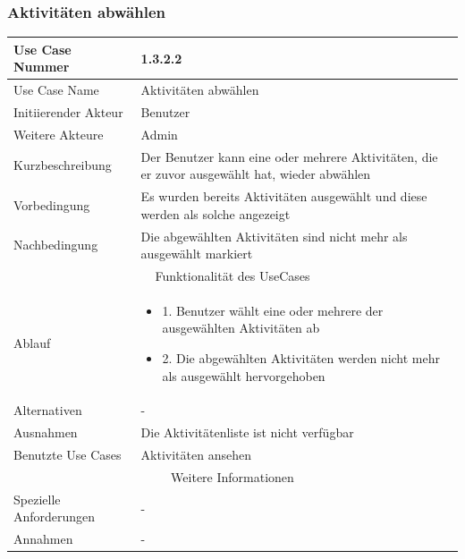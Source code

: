 \documentclass[10pt,a4paper]{article}
\begin{document}
	\subsubsection{Aktivit\"aten abw\"ahlen}
	\begin{tabular}{|l|p{.5\linewidth}|}
	\hline Use Case Nummer & 1.3.2.2 \\ 
	\hline Use Case Name & Aktivit\"aten abw\"ahlen \\ 
	\hline Initiierender Akteur & Benutzer \\
	\hline Weitere Akteure & Admin \\
	\hline Kurzbeschreibung & Der Benutzer kann eine oder mehrere Aktivit\"aten, die er zuvor ausgew\"ahlt hat, wieder abw\"ahlen \\
	\hline Vorbedingung & Es wurden bereits Aktivit\"aten ausgew\"ahlt und diese werden als solche angezeigt \\
	\hline Nachbedingung & Die abgew\"ahlten Aktivit\"aten sind nicht mehr als ausgew\"ahlt markiert \\
	\hline \multicolumn{2}{|c|}{Funktionalität des UseCases}\\
	\hline Ablauf & \begin{itemize}
			\item 1. Benutzer w\"ahlt eine oder mehrere der ausgew\"ahlten Aktivit\"aten ab
			\item 2. Die abgew\"ahlten Aktivit\"aten werden nicht mehr als ausgew\"ahlt hervorgehoben
		\end{itemize} \\
	\hline Alternativen & - \\
	\hline Ausnahmen & Die Aktivit\"atenliste ist nicht verf\"ugbar \\
	\hline Benutzte Use Cases & Aktivit\"aten ansehen \\
	\hline \multicolumn{2}{|c|}{Weitere Informationen} \\
	\hline Spezielle Anforderungen & - \\
	\hline Annahmen & - \\
	\hline
	\end{tabular} 
\end{document}
